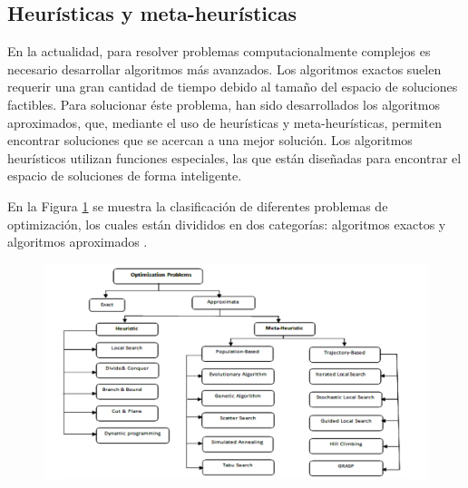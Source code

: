 
\subsection{Heurísticas y meta-heurísticas}

En la actualidad, para resolver problemas computacionalmente complejos es necesario desarrollar algoritmos más avanzados. Los algoritmos exactos suelen requerir una gran cantidad de tiempo debido al tamaño del espacio de soluciones factibles. Para solucionar éste problema, han sido desarrollados los algoritmos aproximados, que, mediante el uso de heurísticas y meta-heurísticas, permiten encontrar soluciones que se acercan a una mejor solución. Los algoritmos heurísticos utilizan funciones especiales, las que están diseñadas para encontrar el espacio de soluciones de forma inteligente.



En la Figura \ref{fig:tax_opt} se muestra la clasificación de diferentes problemas de optimización, los cuales están divididos en dos categorías: algoritmos exactos y algoritmos aproximados \citep{desale_2015}.

\begin{figure}[H]
    \centering
    \includegraphics[width=16cm]{images/cap2/tax_opt.png}
    \label{fig:tax_opt}
\end{figure}


